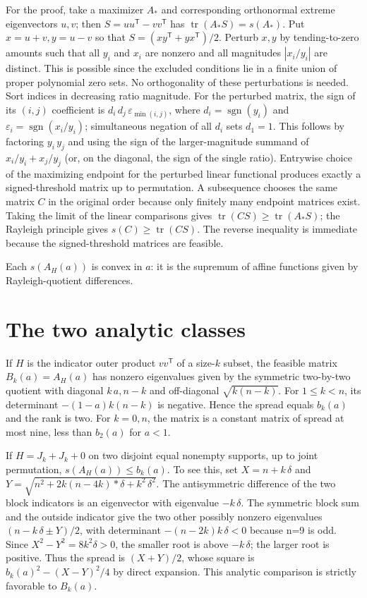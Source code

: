 \documentclass[11pt]{article}
\begin{document}
For the proof, take a maximizer \(A_*\) and corresponding orthonormal extreme eigenvectors \(u,v\); then \(S=uu^{\mathsf T}-vv^{\mathsf T}\) has \(\operatorname{tr}(A_* S)=s(A_*)\). Put \(x=u+v,y=u-v\) so that \(S=(xy^{\mathsf T}+yx^{\mathsf T})/2\). Perturb \(x,y\) by tending-to-zero amounts such that all \(y_i\) and \(x_i\) are nonzero and all magnitudes \(|x_i/y_i|\) are distinct. This is possible since the excluded conditions lie in a finite union of proper polynomial zero sets. No orthogonality of these perturbations is needed. Sort indices in decreasing ratio magnitude. For the perturbed matrix, the sign of its \((i,j)\) coefficient is \(d_i\,d_j\,\varepsilon_{\min(i,j)}\), where \(d_i=\operatorname{sgn}(y_i)\) and \(\varepsilon _i=\operatorname{sgn}(x_i/y_i)\); simultaneous negation of all \(d_i\) sets \(d_1=1\). This follows by factoring \(y_i\,y_j\) and using the sign of the larger-magnitude summand of \(x_i/y_i+x_j/y_j\) (or, on the diagonal, the sign of the single ratio). Entrywise choice of the maximizing endpoint for the perturbed linear functional produces exactly a signed-threshold matrix up to permutation. A subsequence chooses the same matrix \(C\) in the original order because only finitely many endpoint matrices exist. Taking the limit of the linear comparisons gives \(\operatorname{tr}(C S)\ge \operatorname{tr}(A_* S)\); the Rayleigh principle gives \(s(C)\ge \operatorname{tr}(C S)\). The reverse inequality is immediate because the signed-threshold matrices are feasible.

Each \(s(A_H(a))\) is convex in \(a\): it is the supremum of affine functions given by Rayleigh-quotient differences.

\section{The two analytic classes}\label{the-two-analytic-classes}

If \(H\) is the indicator outer product \(vv^{\mathsf T}\) of a size-\(k\) subset, the feasible matrix \(B_k(a)=A_H(a)\) has nonzero eigenvalues given by the symmetric two-by-two quotient with diagonal \(k\,a,n-k\) and off-diagonal \(\sqrt{k(n-k)}\). For \(1\le k<n\), its determinant \(-(1-a)k(n-k)\) is negative. Hence the spread equals \(b_k(a)\) and the rank is two. For \(k=0,n\), the matrix is a constant matrix of spread at most nine, less than \(b_2(a)\) for \(a<1\).

If \(H=J_k+J_k+0\) on two disjoint equal nonempty supports, up to joint permutation, \(s(A_H(a))\le b_k(a)\). To see this, set \(X=n+k\,\delta\) and \(Y=\sqrt{n^2+2k(n-4k)*\delta +k^2\,\delta ^2}\). The antisymmetric difference of the two block indicators is an eigenvector with eigenvalue \(-k\,\delta\). The symmetric block sum and the outside indicator give the two other possibly nonzero eigenvalues \((n-k\,\delta  \pm  Y)/2\), with determinant \(-(n-2k)k\,\delta <0\) because n=9 is odd. Since \(X^2-Y^2=8k^2\delta>0\), the smaller root is above \(-k\,\delta\); the larger root is positive. Thus the spread is \((X+Y)/2\), whose square is \(b_k(a)^2-(X-Y)^2/4\) by direct expansion. This analytic comparison is strictly favorable to \(B_k(a)\).
\end{document}
